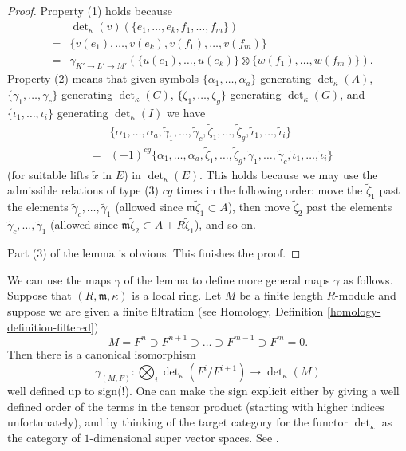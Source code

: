\begin{proof}
\medskip\noindent
Property (1) holds because
\begin{eqnarray*}
& & \det\nolimits_\kappa(v)(\{e_1, \ldots, e_k, f_1, \ldots, f_m\}) \\
& = &
\{v(e_1), \ldots, v(e_k), v(f_1), \ldots, v(f_m)\} \\
& = &
\gamma_{K' \to L' \to M'}(\{u(e_1), \ldots, u(e_k)\}
\otimes \{w(f_1), \ldots, w(f_m)\}).
\end{eqnarray*}
Property (2) means that given symbols
$\{\alpha_1, \ldots, \alpha_a\}$ generating $\det_\kappa(A)$,
$\{\gamma_1, \ldots, \gamma_c\}$ generating $\det_\kappa(C)$,
$\{\zeta_1, \ldots, \zeta_g\}$ generating $\det_\kappa(G)$, and
$\{\iota_1, \ldots, \iota_i\}$ generating $\det_\kappa(I)$
we have
\begin{eqnarray*}
& & \{\alpha_1, \ldots, \alpha_a, \tilde\gamma_1, \ldots, \tilde\gamma_c,
\tilde\zeta_1, \ldots, \tilde\zeta_g, \tilde\iota_1, \ldots, \tilde\iota_i\} \\
& = &
(-1)^{cg} \{\alpha_1, \ldots, \alpha_a, \tilde\zeta_1, \ldots, \tilde\zeta_g,
\tilde\gamma_1, \ldots, \tilde\gamma_c, \tilde\iota_1, \ldots, \tilde\iota_i\}
\end{eqnarray*}
(for suitable lifts $\tilde{x}$ in $E$) in $\det_\kappa(E)$.
This holds because we may use the admissible relations of type (3)
$cg$ times in the following order: move the
$\tilde\zeta_1$ past the elements
$\tilde\gamma_c, \ldots, \tilde\gamma_1$
(allowed since $\mathfrak m\tilde\zeta_1 \subset A$),
then move $\tilde\zeta_2$ past the elements
$\tilde\gamma_c, \ldots, \tilde\gamma_1$
(allowed since $\mathfrak m\tilde\zeta_2 \subset A + R\tilde\zeta_1$),
and so on.

\medskip\noindent
Part (3) of the lemma is obvious.
This finishes the proof.
\end{proof}

\noindent
We can use the maps $\gamma$ of the lemma to define more general maps
$\gamma$ as follows. Suppose that $(R, \mathfrak m, \kappa)$ is a
local ring. Let $M$ be a finite length $R$-module and suppose we 
are given a finite filtration (see
Homology, Definition \ref{homology-definition-filtered})
$$
M = F^n \supset F^{n + 1} \supset \ldots \supset F^{m - 1} \supset F^m = 0.
$$
Then there is a canonical isomorphism
$$
\gamma_{(M, F)} :
\bigotimes\nolimits_i \det\nolimits_\kappa(F^i/F^{i + 1})
\longrightarrow
\det\nolimits_\kappa(M)
$$
well defined up to sign(!). One can make the sign explicit either by
giving a well defined order of the terms in the tensor product (starting with
higher indices unfortunately), and by thinking of the target category for
the functor $\det_\kappa$ as the category of
$1$-dimensional super vector spaces. See \cite[Section 1]{determinant}.


